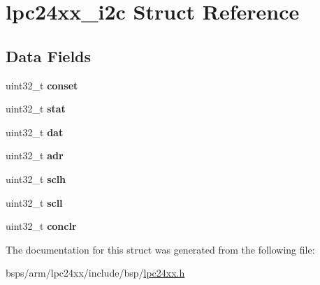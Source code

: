 \hypertarget{structlpc24xx__i2c}{}\section{lpc24xx\+\_\+i2c Struct Reference}
\label{structlpc24xx__i2c}
\subsection*{Data Fields}
\begin{DoxyCompactItemize}
\item 
\mbox{\label{structlpc24xx__i2c_a1a67c4268122c7478dfe5f12793d061b}} 
uint32\+\_\+t {\bfseries conset}
\item 
\mbox{\label{structlpc24xx__i2c_a21d1f60d9b51276fa55e2efcfbe91b45}} 
uint32\+\_\+t {\bfseries stat}
\item 
\mbox{\label{structlpc24xx__i2c_a229e19b370c9b99166f6f4a044a2ef94}} 
uint32\+\_\+t {\bfseries dat}
\item 
\mbox{\label{structlpc24xx__i2c_a9c2216864448829787ba64834f4e7327}} 
uint32\+\_\+t {\bfseries adr}
\item 
\mbox{\label{structlpc24xx__i2c_ae00ca8572b1009361b72a8233809f3e7}} 
uint32\+\_\+t {\bfseries sclh}
\item 
\mbox{\label{structlpc24xx__i2c_acf03fa6be236beb7810f49d2fa4ab419}} 
uint32\+\_\+t {\bfseries scll}
\item 
\mbox{\label{structlpc24xx__i2c_a561e978ff4bc01d8e2af6bb2b085ba62}} 
uint32\+\_\+t {\bfseries conclr}
\end{DoxyCompactItemize}


The documentation for this struct was generated from the following file\+:\begin{DoxyCompactItemize}
\item 
bsps/arm/lpc24xx/include/bsp/\mbox{\hyperlink{lpc24xx_8h}{lpc24xx.\+h}}\end{DoxyCompactItemize}
